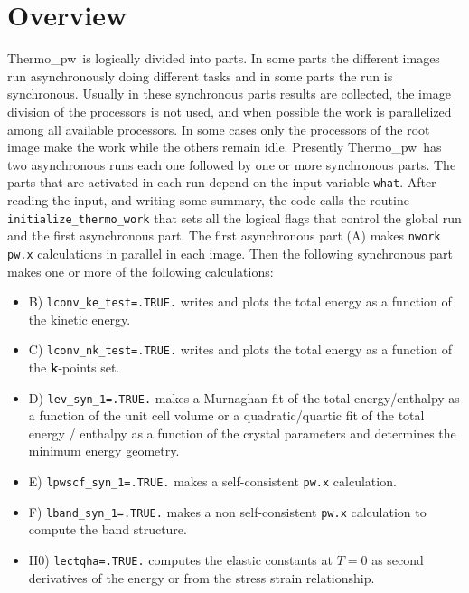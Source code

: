 \documentclass[12pt,a4paper,twoside]{report}
\def\tpw{{\sc Thermo\_pw}}
\begin{document}
{\color{coral}\section{Overview}}
\color{black}
\tpw\ is logically divided into parts. In some parts the different
images run asynchronously doing different tasks and in some parts the
run is synchronous. Usually in these synchronous parts results are 
collected, the image division of the processors is not used, and when possible
the work is parallelized among all available processors. In some cases
only the processors of the root image make the work while the others remain
idle.
Presently \tpw\ has two asynchronous runs each one followed
by one or more synchronous parts. The parts that are activated in
each run depend on the input variable \texttt{what}. After reading the input,
and writing some summary, the code calls the routine 
\texttt{initialize\_thermo\_work} that sets all the
logical flags that control the global run and the first asynchronous
part. The first asynchronous part (A) makes \texttt{nwork} \texttt{pw.x} 
calculations in parallel in each image. 
Then the following synchronous part makes one or more of
the following calculations:
\begin{itemize}

\item
B) \texttt{lconv\_ke\_test=.TRUE.} writes and plots the total
energy as a function of the kinetic energy.

\item
C) \texttt{lconv\_nk\_test=.TRUE.} writes and plots the total energy
as a function of the {\bf k}-points set.

\item
D) \texttt{lev\_syn\_1=.TRUE.} makes a Murnaghan fit of the 
total energy/enthalpy as a function of the unit cell volume or 
a quadratic/quartic fit of the total energy / enthalpy as a function 
of the crystal parameters and determines the minimum energy geometry.

\item
E) \texttt{lpwscf\_syn\_1=.TRUE.} makes a self-consistent \texttt{pw.x} 
calculation.

\item
F) \texttt{lband\_syn\_1=.TRUE.} makes a non self-consistent \texttt{pw.x}
calculation to compute the band structure.

\item
H0) \texttt{lectqha=.TRUE.} computes the elastic constants at $T=0$
as second derivatives of the energy or from the stress strain relationship. 

\end{itemize}
\end{document}
